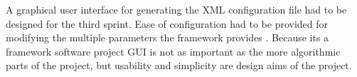 A graphical user interface for generating the XML configuration file had to be designed for the third sprint.
Ease of configuration had to be provided for modifying the multiple parameters the framework provides . Because
its a framework software project GUI is not as important as the more algorithmic parts of the project, but usability
and simplicity are design aims of the project.